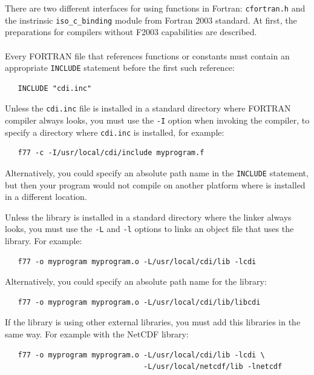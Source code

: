There are two different interfaces for using {\CDI} functions in Fortran:
{\tt cfortran.h} and the instrinsic {\tt iso\_c\_binding} module from Fortran
2003 standard. At  first, the preparations for compilers without F2003
capabilities are described.\\\\
Every FORTRAN file that references {\CDI} functions or constants must contain
an appropriate {\tt INCLUDE} statement before the first such reference:

\begin{verbatim}
   INCLUDE "cdi.inc"
\end{verbatim}

Unless the {\tt cdi.inc} file is installed in a standard directory where
FORTRAN compiler always looks, you must use the {\tt -I} option when invoking
the compiler, to specify a directory where {\tt cdi.inc} is installed, for example:

\begin{verbatim}
   f77 -c -I/usr/local/cdi/include myprogram.f
\end{verbatim}

Alternatively, you could specify an absolute path name in the {\tt INCLUDE}
statement, but then your program would not compile on another platform
where {\CDI} is installed in a different location.

Unless the {\CDI} library is installed in a standard directory where the linker
always looks, you must use the {\tt -L} and {\tt -l} options to links an object file that
uses the {\CDI} library. For example:

\begin{verbatim}
   f77 -o myprogram myprogram.o -L/usr/local/cdi/lib -lcdi
\end{verbatim}

Alternatively, you could specify an absolute path name for the library:

\begin{verbatim}
   f77 -o myprogram myprogram.o -L/usr/local/cdi/lib/libcdi
\end{verbatim}

If the {\CDI} library is using other external libraries, you must add this
libraries in the same way.
For example with the NetCDF library:

\begin{verbatim}
   f77 -o myprogram myprogram.o -L/usr/local/cdi/lib -lcdi \
                                -L/usr/local/netcdf/lib -lnetcdf
\end{verbatim}

